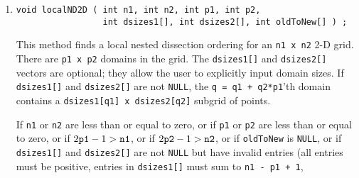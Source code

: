 \begin{enumerate}
\begin{verbatim}
\end{verbatim}
This method this vector fills a permutation vector with the
nested dissection
new-to-old ordering of the vertices for the subgrid defined by
nodes whose coordinates lie in
\begin{verbatim}
[west, east] x [south, north] x [bottom, top].
\end{verbatim}
There is one important difference between this method and {\tt
mkNDperm()} above; this method finds {\it double-wide} separators,
necessary for an operator with more than nearest neighbor grid
point coupling.
The method calls itself recursively.
To find the permutation for an {\tt n1 x n2 x n3} grid, call
\begin{verbatim}
mkNDperm(n1, n2, n3, newToOld, 0, n1-1, 0, n2-1, 0, n3-1) ;
\end{verbatim}
from a driver program.
\par {}
If {\tt n1}, {\tt n2} or {\tt n3} are less than or equal to zero,
or if {\tt newToOld} is {\tt NULL},
or if {\tt west}, {\tt south} or {\tt bottom} 
are less than or equal to zero,
of if ${\tt east} \ge {\tt n1}$,
of if ${\tt north} \ge {\tt n2}$,
of if ${\tt top} \ge {\tt n3}$,
an error message is printed and the program exits.
\item
\begin{verbatim}
void localND2D ( int n1, int n2, int p1, int p2, 
                 int dsizes1[], int dsizes2[], int oldToNew[] ) ;
\end{verbatim}
This method finds a local nested dissection ordering 
\cite{bha93-localND} for an {\tt n1 x n2} 2-D grid.
There are {\tt p1 x p2} domains in the grid.
The {\tt dsizes1[]} and {\tt dsizes2[]} vectors are optional;
they allow the user to explicitly input domain sizes.
If {\tt dsizes1[]} and {\tt dsizes2[]} are not {\tt NULL},
the {\tt q = q1 + q2*p1}'th domain contains a
{\tt dsizes1[q1] x dsizes2[q2]} subgrid of points.
\par {}
If {\tt n1} or {\tt n2} are less than or equal to zero,
or if {\tt p1} or {\tt p2} are less than or equal to zero,
or if $2{\tt p1} - 1 > {\tt n1}$,
or if $2{\tt p2} - 1 > {\tt n2}$,
or if {\tt oldToNew} is {\tt NULL},
or if {\tt dsizes1[]} and {\tt dsizes2[]} are not {\tt NULL} 
but have invalid entries (all entries must be positive, 
entries in {\tt dsizes1[]} must sum to {\tt n1 - p1 + 1},

\end{enumerate}
